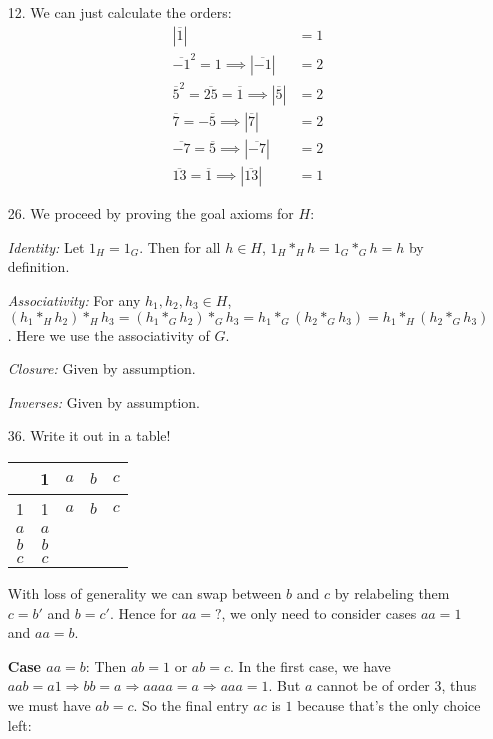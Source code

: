 \documentclass{article}
\begin{document}
\begin{enumerate}
    \item [12.] We can just calculate the orders:
    \begin{align*}    
        |\overline{1}| &= 1 \\
        \overline{-1}^2 = 1 \implies |\overline {-1}| &= 2  \\
        \overline{5}^2 = \overline{25} = \overline 1 \implies |\overline{5}| &= 2 \\
        \overline{7} = -\overline{5} \implies |\overline{7}| &= 2 \\
        \overline{-7} = \overline{5} \implies |\overline{-7}| &= 2 \\
        \overline{13} = \overline{1} \implies |\overline{13}| &= 1
    \end{align*}

    \item [26.] We proceed by proving the goal axioms for $H$:
    
    \textit{Identity:} Let $1_H = 1_G$. Then for all $h \in H$, $1_H *_H h = 1_G *_G h = h$ by definition.

    \textit{Associativity:} For any $h_1, h_2, h_3 \in H$, $(h_1 *_H h_2) *_H h_3 = (h_1 *_G h_2) *_G h_3 = h_1 *_G (h_2 *_G h_3) = h_1 *_H (h_2 *_G h_3)$. Here we use the associativity of $G$.

    \textit{Closure:} Given by assumption.

    \textit{Inverses:} Given by assumption.

    \item [36.] Write it out in a table!
    
    \begin{center}
        \begin{tabular}{ c | c c c c }
         & 1 & $a$ & $b$ & $c$ \\ 
        \hline
        1 & 1 & $a$ & $b$ & $c$ \\  
        $a$ & $a$ &  &  &  \\  
        $b$ & $b$ &  &  &  \\ 
        $c$ & $c$ &  &  &  \\ 
        \end{tabular}
    \end{center}

    With loss of generality we can swap between $b$ and $c$ by relabeling them $c = b'$ and $b = c'$. Hence for $aa = ?$, we only need to consider cases $aa = 1$ and $aa = b$. 
    
    \textbf{Case $aa = b$}: Then $ab = 1$ or $ab = c$. In the first case, we have $aab = a1 \Rightarrow bb = a \Rightarrow aaaa = a \Rightarrow aaa = 1$. But $a$ cannot be of order $3$, thus we must have $ab = c$. So the final entry $ac$ is $1$ because that's the only choice left:    
    

\end{enumerate}
\end{document}
